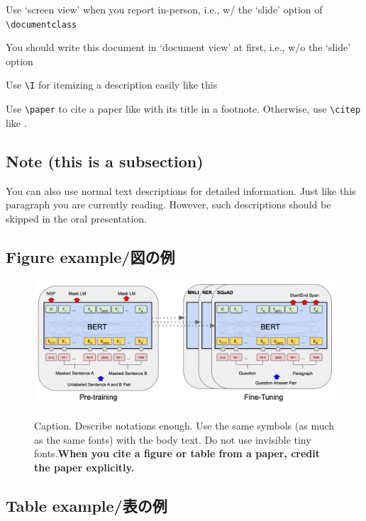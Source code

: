 \documentclass[]{lrlabreport}
\begin{document}
\I Use `screen view' when you report in-person, i.e., w/ the `slide' option of \verb|\documentclass|

\I You should write this document in `document view' at first, i.e., w/o the `slide' option


\I Use \verb|\I| for itemizing a description easily like this

\I Use \verb|\paper| to cite a paper like  with its title in a footnote. Otherwise, use \verb|\citep| like \citep{nakaneNLP2025}.

\subsection{Note (this is a subsection)}
{\small \redcolor You can also use normal text descriptions for detailed information. Just like this paragraph you are currently reading. However, such descriptions should be skipped in the oral presentation.} 

\subsection{Figure example/図の例}

\begin{figure}[H] %
    \centering
    \includegraphics[width=.9\linewidth]{fig/bert_aclanth_N19-1423_fig-1.pdf}
    \\{\tiny \cite[Figure 1]{devlin-etal-2019-bert}}
    \caption{\footnotesize Caption. Describe notations enough. Use the same symbols (as much as the same fonts) with the body text. Do not use invisible tiny fonts.\bf When you cite a figure or table from a paper, credit the paper explicitly.}
    \label{fig:architecture}
\end{figure}

\subsection{Table example/表の例}
\end{document}
